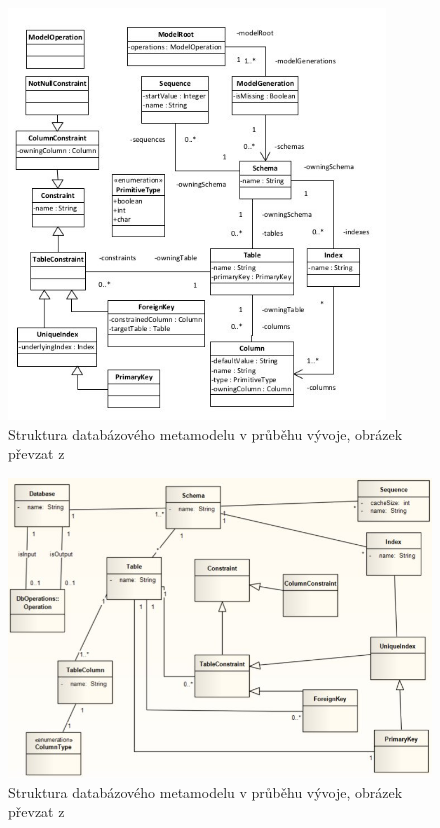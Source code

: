 \documentclass[11pt,twoside,a4paper]{book}
\begin{document}
\begin{figure}[H]
\begin{center}
\includegraphics[width=10cm]{figures/rdb_structure_tarant}
\caption{Struktura databázového metamodelu v průběhu vývoje, obrázek převzat z
\cite{Tarant_bp}}
\label{fig:rdb_str_tarant}
\end{center}
\end{figure}
%
\begin{figure}[H]
\begin{center}
\includegraphics[width=15cm]{figures/rdb_structure_lukes}
\caption{Struktura databázového metamodelu v průběhu vývoje, obrázek převzat z
\cite{Lukes}}
\label{fig:rdb_str_lukes}
\end{center}
\end{figure}
%
\FloatBarrier
\end{document}
